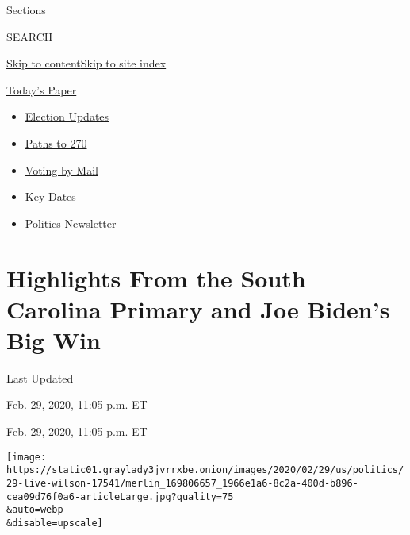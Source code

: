 Sections

SEARCH

\protect\hyperlink{site-content}{Skip to
content}\protect\hyperlink{site-index}{Skip to site index}

\href{https://myaccount.nytimes3xbfgragh.onion/auth/login?response_type=cookie\&client_id=vi}{}

\href{https://www.nytimes3xbfgragh.onion/section/todayspaper}{Today's
Paper}

\begin{itemize}
\item
  \href{https://www.nytimes3xbfgragh.onion/live/2020/09/07/us/trump-vs-biden?action=click\&pgtype=Article\&state=default\&region=TOP_BANNER\&context=storylines_menu}{Election
  Updates}
\item
  \href{https://www.nytimes3xbfgragh.onion/interactive/2020/us/elections/election-states-biden-trump.html?action=click\&pgtype=Article\&state=default\&region=TOP_BANNER\&context=storylines_menu}{Paths
  to 270}
\item
  \href{https://www.nytimes3xbfgragh.onion/interactive/2020/08/31/us/politics/vote-by-mail-deadlines.html?action=click\&pgtype=Article\&state=default\&region=TOP_BANNER\&context=storylines_menu}{Voting
  by Mail}
\item
  \href{https://www.nytimes3xbfgragh.onion/interactive/2019/us/elections/2020-presidential-election-calendar.html?action=click\&pgtype=Article\&state=default\&region=TOP_BANNER\&context=storylines_menu}{Key
  Dates}
\item
  \href{https://www.nytimes3xbfgragh.onion/newsletters/politics?action=click\&pgtype=Article\&state=default\&region=TOP_BANNER\&context=storylines_menu}{Politics
  Newsletter}
\end{itemize}

\hypertarget{highlights-from-the-south-carolina-primary-and-joe-bidens-big-win}{%
\section{Highlights From the South Carolina Primary and Joe Biden's Big
Win}\label{highlights-from-the-south-carolina-primary-and-joe-bidens-big-win}}

Last Updated

Feb. 29, 2020, 11:05 p.m. ET

Feb. 29, 2020, 11:05 p.m. ET

\texttt{[image: https://static01.graylady3jvrrxbe.onion/images/2020/02/29/us/politics/29-live-wilson-17541/merlin\_169806657\_1966e1a6-8c2a-400d-b896-cea09d76f0a6-articleLarge.jpg?quality=75\\\&auto=webp\\\&disable=upscale]}

